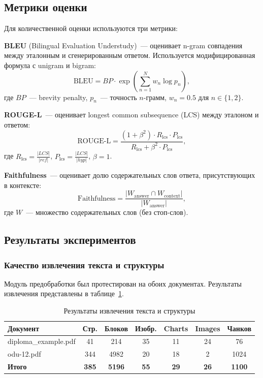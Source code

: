 \documentclass[a4paper,12pt]{article}
\begin{document}
\subsection{Метрики оценки}

Для количественной оценки используются три метрики:

\textbf{BLEU} (Bilingual Evaluation Understudy)~--- оценивает n-gram совпадения между эталонным и сгенерированным ответом. Используется модифицированная формула с unigram и bigram:
\[
\text{BLEU} = BP \cdot \exp\left(\sum_{n=1}^{N} w_n \log p_n\right),
\]
где $BP$~--- brevity penalty, $p_n$~--- точность $n$-грамм, $w_n = 0.5$ для $n \in \{1, 2\}$.

\textbf{ROUGE-L}~--- оценивает longest common subsequence (LCS) между эталоном и ответом:
\[
\text{ROUGE-L} = \frac{(1 + \beta^2) \cdot R_{\text{lcs}} \cdot P_{\text{lcs}}}{R_{\text{lcs}} + \beta^2 \cdot P_{\text{lcs}}},
\]
где $R_{\text{lcs}} = \frac{|LCS|}{|ref|}$, $P_{\text{lcs}} = \frac{|LCS|}{|hyp|}$, $\beta = 1$.

\textbf{Faithfulness}~--- оценивает долю содержательных слов ответа, присутствующих в контексте:
\[
\text{Faithfulness} = \frac{|W_\text{answer} \cap W_\text{context}|}{|W_\text{answer}|},
\]
где $W$~--- множество содержательных слов (без стоп-слов).

\subsection{Результаты экспериментов}

\subsubsection{Качество извлечения текста и структуры}

Модуль предобработки был протестирован на обоих документах. Результаты извлечения представлены в таблице~\ref{tab:extraction-results}.

\begin{table}[H]
    \centering
    \caption{Результаты извлечения текста и структуры}
    \label{tab:extraction-results}
    \begin{tabular}{|l|c|c|c|c|c|c|}
        \hline
        \textbf{Документ} & \textbf{Стр.} & \textbf{Блоков} & \textbf{Изобр.} & \textbf{Charts} & \textbf{Images} & \textbf{Чанков} \\
        \hline
        diploma\_example.pdf & 41 & 214 & 35 & 11 & 24 & 76 \\
        \hline
        odu-12.pdf & 344 & 4982 & 20 & 18 & 2 & 1024 \\
        \hline
        \textbf{Итого} & \textbf{385} & \textbf{5196} & \textbf{55} & \textbf{29} & \textbf{26} & \textbf{1100} \\
        \hline
    \end{tabular}
\end{table}
\end{document}
